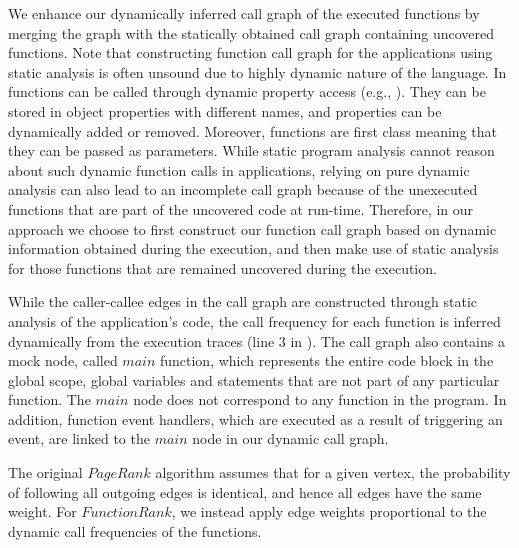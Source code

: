 We enhance our dynamically inferred call graph of the executed functions by merging the graph with the statically obtained call graph containing uncovered functions. 
Note that constructing function call graph for the \javascript applications using static analysis is often unsound due to highly dynamic nature of the \javascript language. In \javascript functions can be called through dynamic property access (e.g., ). They can be stored in object properties with different names, and properties can be dynamically added or removed. Moreover, \javascript functions are first class meaning that they can be passed as parameters. While static program analysis cannot reason about such dynamic function calls in \javascript applications, relying on pure dynamic analysis can also lead to an incomplete call graph because of the unexecuted functions that are part of the uncovered code at run-time. Therefore, in our approach we choose to first construct our function call graph based on dynamic information obtained during the execution, and then make use of static analysis for those functions that are remained uncovered during the execution. 

 \label{Sec:dynamicCallFreq}
While the caller-callee edges in the call graph are constructed through static analysis of the application's code, the call frequency for each function is inferred dynamically from the execution traces (line 3 in ).
The call graph also contains a mock node, called $main$ function, which represents the entire code block in the global scope, \ie global variables and statements that are not part of any particular function.
The $main$ node does not correspond to any function in the program.
In addition, function event handlers, which are executed as a result of triggering an event, are linked to the $main$ node in our dynamic call graph.



The original $PageRank$ algorithm \cite{brin:cnis98} assumes that for a given vertex, 
the probability of following all outgoing edges is identical, and hence
all edges have the same weight. For $FunctionRank$, 
we instead apply edge weights proportional to the dynamic call frequencies of the functions.  %

